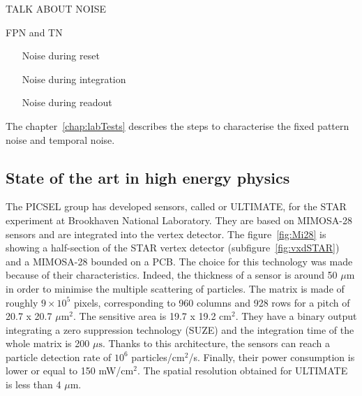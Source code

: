     TALK ABOUT NOISE

    \gls{FPN} and \gls{TN}
    \begin{itemize}
      \item[Noise during reset]
      \item[Noise during integration]
      \item[Noise during readout]
    \end{itemize}

    The chapter~\ref{chap:labTests} describes the steps to characterise the fixed pattern noise and temporal noise.


    \subsection{State of the art in high energy physics}

    The PICSEL group has developed sensors, called or ULTIMATE, for the STAR experiment at Brookhaven National Laboratory.
    They are based on \gls{MIMOSA}-28 sensors and are integrated into the vertex detector.
    The figure~\ref{fig:Mi28} is showing a half-section of the STAR vertex detector (subfigure~\ref{fig:vxdSTAR}) and a \gls{MIMOSA}-28 bounded on a PCB.
    The choice for this technology was made because of their characteristics.
    Indeed, the thickness of a sensor is around 50 $\mu\text{m}$ in order to minimise the multiple scattering of particles.
    The matrix is made of roughly $9 \times 10^5$ pixels, corresponding to 960 columns and 928 rows for a pitch of 20.7 x 20.7 $\mu\text{m}^2$.
    The sensitive area is 19.7 x 19.2 $\text{cm}^2$.
    They have a binary output integrating a zero suppression technology (SUZE) and the integration time of the whole matrix is 200 $\mu\text{s}$.
    Thanks to this architecture, the sensors can reach a particle detection rate of $10^6$ particles/$\text{cm}^2$/s. 
    Finally, their power consumption is lower or equal to 150 mW/$\text{cm}^2$.
    The spatial resolution obtained for ULTIMATE is less than 4 $\mu\text{m}$.

